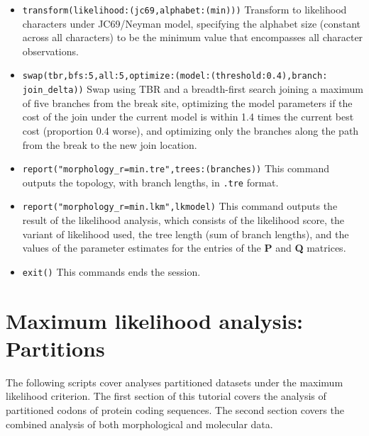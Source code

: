 \begin{itemize}
\item \texttt{transform(likelihood:(jc69,alphabet:(min)))} Transform to likelihood characters under JC69/Neyman model, specifying 
the alphabet size (constant across all characters) to be the minimum value that encompasses all character observations.
\item \texttt{swap(tbr,bfs:5,all:5,optimize:(model:(threshold:0.4),branch:\\join\_delta))} Swap using TBR and a breadth-first search
joining a maximum of five branches from the break site, optimizing the model parameters if the cost of the join under the 
current model is within 1.4 times the current best cost (proportion 0.4 worse), and optimizing only the branches along 
the path from the break to the new join location. 
\item \texttt{report("morphology\_r=min.tre",trees:(branches))} This command outputs the topology, with branch lengths, in 
\texttt{.tre} format.
\item \texttt{report("morphology\_r=min.lkm",lkmodel)} This command outputs the result of the likelihood analysis, which 
consists of the likelihood score, the variant of likelihood used, the tree length (sum of branch lengths), and the values 
of the parameter estimates for the entries of the \textbf{P} and \textbf{Q} matrices.
\item \texttt{exit()} This commands ends the \poy session.
\end{itemize}

\section{Maximum likelihood analysis: Partitions}{\label{tutorial 13}}
The following scripts cover analyses partitioned datasets under the maximum likelihood criterion. The first section of this 
tutorial covers the analysis of partitioned codons of protein coding sequences.  The second section covers the combined
analysis of both morphological and molecular data.


